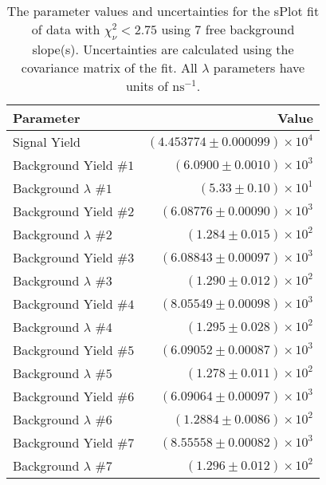
\begin{table}
    \begin{center}
        \begin{tabular}{lr}\toprule
            Parameter & Value \\\midrule
            Signal Yield & $(4.453774 \pm 0.000099) \times 10^{4}$ \\
            Background Yield $\#1$ & $(6.0900 \pm 0.0010) \times 10^{3}$ \\
            Background $\lambda$ $\#1$ & $(5.33 \pm 0.10) \times 10^{1}$ \\
            Background Yield $\#2$ & $(6.08776 \pm 0.00090) \times 10^{3}$ \\
            Background $\lambda$ $\#2$ & $(1.284 \pm 0.015) \times 10^{2}$ \\
            Background Yield $\#3$ & $(6.08843 \pm 0.00097) \times 10^{3}$ \\
            Background $\lambda$ $\#3$ & $(1.290 \pm 0.012) \times 10^{2}$ \\
            Background Yield $\#4$ & $(8.05549 \pm 0.00098) \times 10^{3}$ \\
            Background $\lambda$ $\#4$ & $(1.295 \pm 0.028) \times 10^{2}$ \\
            Background Yield $\#5$ & $(6.09052 \pm 0.00087) \times 10^{3}$ \\
            Background $\lambda$ $\#5$ & $(1.278 \pm 0.011) \times 10^{2}$ \\
            Background Yield $\#6$ & $(6.09064 \pm 0.00097) \times 10^{3}$ \\
            Background $\lambda$ $\#6$ & $(1.2884 \pm 0.0086) \times 10^{2}$ \\
            Background Yield $\#7$ & $(8.55558 \pm 0.00082) \times 10^{3}$ \\
            Background $\lambda$ $\#7$ & $(1.296 \pm 0.012) \times 10^{2}$ \\\bottomrule
        \end{tabular}
        \caption{The parameter values and uncertainties for the sPlot fit of data with $\chi^2_\nu < 2.75$ using 7 free background slope(s). Uncertainties are calculated using the covariance matrix of the fit. All $\lambda$ parameters have units of $\si{\nano\second}^{-1}$.}
    \end{center}
\end{table}
